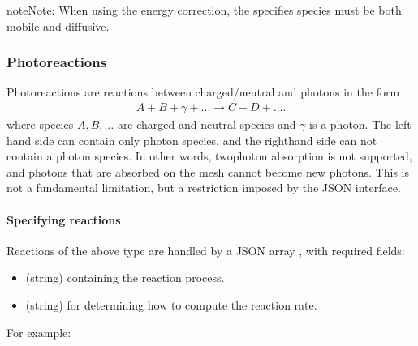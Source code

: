 \documentclass[letterpaper,10pt,english]{sphinxmanual}
\begin{document}
\begin{sphinxadmonition}{note}{Note:}
When using the energy correction, the specifies species must be both mobile and diffusive.
\end{sphinxadmonition}


\subsubsection{Photo\sphinxhyphen{}reactions}
\label{\detokenize{Applications/CdrPlasmaModel:photo-reactions}}\label{\detokenize{Applications/CdrPlasmaModel:chap-photoreactionsjson}}
Photo\sphinxhyphen{}reactions are reactions between charged/neutral and photons in the form
\begin{equation*}
\begin{split}A + B + \gamma + \ldots \rightarrow C + D + \ldots.\end{split}
\end{equation*}
where species \(A, B, \ldots\) are charged and neutral species and \(\gamma\) is a photon.
The left hand side can contain only  photon species, and the right\sphinxhyphen{}hand side can not contain a photon species.
In other words, two\sphinxhyphen{}photon absorption is not supported, and photons that are absorbed on the mesh cannot become new photons.
This is not a fundamental limitation, but a restriction imposed by the JSON interface.


\paragraph{Specifying reactions}
\label{\detokenize{Applications/CdrPlasmaModel:id9}}
Reactions of the above type are handled by a JSON array , with required fields:
\begin{itemize}
\item {} 
 (string) containing the reaction process.

\item {} 
 (string) for determining how to compute the reaction rate.

\end{itemize}

For example:

\begin{sphinxVerbatim}[commandchars=\\\{\},formatcom=\scriptsize]
  \PYG{p}{[}
     
  \PYG{p}{]}
\end{sphinxVerbatim}
\end{document}
